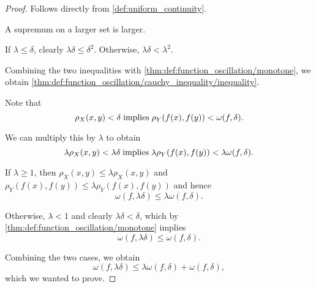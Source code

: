 \begin{proof}
   Follows directly from \cref{def:uniform_continuity}.

   A supremum on a larger set is larger.

   If \( \lambda \leq \delta \), clearly \( \lambda \delta \leq \delta^2 \). Otherwise, \( \lambda \delta < \lambda^2 \).

  Combining the two inequalities with \cref{thm:def:function_oscillation/monotone}, we obtain \cref{thm:def:function_oscillation/cauchy_inequality/inequality}.

   Note that
  \begin{equation*}
    \rho_{X}(x, y) < \delta \T{implies} \rho_{Y}(f(x), f(y)) < \omega(f, \delta).
  \end{equation*}

  We can multiply this by \( \lambda \) to obtain
  \begin{equation*}
    \lambda \rho_{X}(x, y) < \lambda \delta \T{implies} \lambda \rho_{Y}(f(x), f(y)) < \lambda \omega(f, \delta).
  \end{equation*}

  If \( \lambda \geq 1 \), then \( \rho_{X}(x, y) \leq \lambda \rho_{X}(x, y) \) and \( \rho_{Y}(f(x), f(y)) \leq \lambda \rho_{Y}(f(x), f(y)) \) and hence
  \begin{equation*}
    \omega(f, \lambda \delta) \leq \lambda \omega(f, \delta).
  \end{equation*}

  Otherwise, \( \lambda < 1 \) and clearly \( \lambda \delta < \delta \), which by \cref{thm:def:function_oscillation/monotone} implies
  \begin{equation*}
    \omega(f, \lambda \delta) \leq \omega(f, \delta).
  \end{equation*}

  Combining the two cases, we obtain
  \begin{equation*}
    \omega(f, \lambda \delta) \leq \lambda \omega(f, \delta) + \omega(f, \delta),
  \end{equation*}
  which we wanted to prove.
\end{proof}
